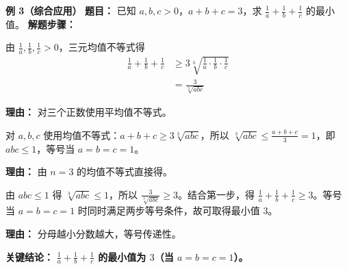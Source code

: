 \begin{examplebox}
	\medskip
	\textbf{\textcolor{CExample}{例 3（综合应用）}}
	\textbf{\textcolor{CExample}{题目：}}
	已知 $a,b,c>0$，$a+b+c=3$，求 $\frac1a+\frac1b+\frac1c$ 的最小值。
	\textbf{\textcolor{CExample}{解题步骤：}}
	\begin{description}[style=nextline, leftmargin=2.8em, labelsep=0.5em, itemsep=0.45em]
		\item[\textbf{第一步（应用均值到倒数之和）：}]
			由 $\frac1a,\frac1b,\frac1c>0$，三元均值不等式得
			\[
				\begin{aligned}
					\frac1a+\frac1b+\frac1c &\ge 3\sqrt[3]{\frac1a\cdot\frac1b\cdot\frac1c} \\ &= \frac{3}{\sqrt[3]{abc}}
			\end{aligned}
			\]
			\par\textbf{理由：} 对三个正数使用平均值不等式。
		\item[\textbf{第二步（求 $abc$ 最大值）：}]
			对 $a,b,c$ 使用均值不等式：$a+b+c \ge 3\sqrt[3]{abc}$，所以 $\sqrt[3]{abc} \le \frac{a+b+c}{3}=1$，即 $abc \le 1$，等号当 $a=b=c=1$。
			\par\textbf{理由：} 由 $n=3$ 的均值不等式直接得。
		\item[\textbf{第三步（结合求最小值）：}]
			由 $abc \le 1$ 得 $\sqrt[3]{abc} \le 1$，所以 $\frac{3}{\sqrt[3]{abc}} \ge 3$。结合第一步，得 $\frac1a+\frac1b+\frac1c \ge 3$。等号当 $a=b=c=1$ 时同时满足两步等号条件，故可取得最小值 $3$。
			\par\textbf{理由：} 分母越小分数越大，等号传递性。
	\end{description}
	\textbf{\textcolor{CExample}{关键结论：}}
	\textbf{$\frac1a+\frac1b+\frac1c$ 的最小值为 $3$（当 $a=b=c=1$）。}
\end{examplebox}
